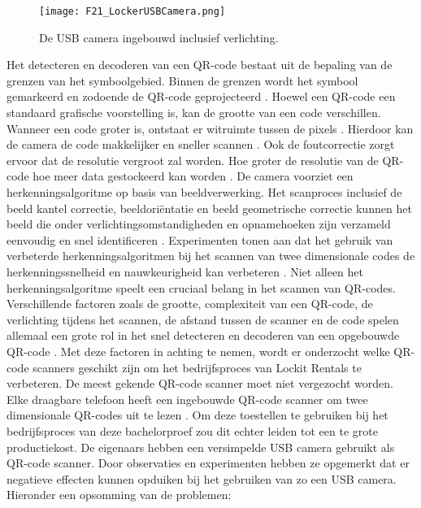 \begin{figure}[h]
    \centering
    \texttt{[image: F21\_LockerUSBCamera.png]}
    \captionsetup{justification=ce/brntering, singlelinecheck=false}    
    \caption{De USB camera ingebouwd inclusief verlichting.}
    \label{fig:usbcameraLocker}
\end{figure}
\newpage
\newline
Het detecteren en decoderen van een QR-code bestaat uit de bepaling van de grenzen van het symboolgebied. Binnen de grenzen wordt het symbool gemarkeerd en zodoende de QR-code geprojecteerd \autocite{Belussi2011}. Hoewel een QR-code een standaard grafische voorstelling is, kan de grootte van een code verschillen. Wanneer een code groter is, ontstaat er witruimte tussen de pixels \autocite{Li2018}. Hierdoor kan de camera de code makkelijker en sneller scannen \autocite{Karrach2020}. Ook de foutcorrectie zorgt ervoor dat de resolutie vergroot zal worden. Hoe groter de resolutie van de QR-code hoe meer data gestockeerd kan worden \autocite{Chow2016}.
\newline
De camera voorziet een herkenningsalgoritme op basis van beeldverwerking. Het scanproces inclusief de beeld kantel correctie, beeldoriëntatie en beeld geometrische correctie kunnen het beeld die onder verlichtingsomstandigheden en opnamehoeken zijn verzameld eenvoudig en snel identificeren \autocite{Gu2011}.
Experimenten tonen aan dat het gebruik van verbeterde herkenningsalgoritmen bij het scannen van twee dimensionale codes de herkenningssnelheid en nauwkeurigheid kan verbeteren \autocite{Gu2011}.
\newline
Niet alleen het herkenningsalgoritme speelt een cruciaal belang in het scannen van QR-codes. Verschillende factoren zoals de grootte, complexiteit van een QR-code, de verlichting tijdens het scannen, de afstand tussen de scanner en de code spelen allemaal een grote rol in het snel detecteren en decoderen van een opgebouwde QR-code \autocite{Liu2008}. Met deze factoren in achting te nemen, wordt er onderzocht welke QR-code scanners geschikt zijn om het bedrijfsproces van Lockit Rentals te verbeteren.
\newline
De meest gekende QR-code scanner moet niet vergezocht worden. Elke draagbare telefoon heeft een ingebouwde QR-code scanner om twee dimensionale QR-codes uit te lezen \autocite{Abdulhakeem2014}. Om deze toestellen te gebruiken bij het bedrijfsproces van deze bachelorproef zou dit echter leiden tot een te grote productiekost. De eigenaars hebben een versimpelde USB camera gebruikt als QR-code scanner. Door observaties en experimenten hebben ze opgemerkt dat er negatieve effecten kunnen opduiken bij het gebruiken van zo een USB camera. Hieronder een opsomming van de problemen:

